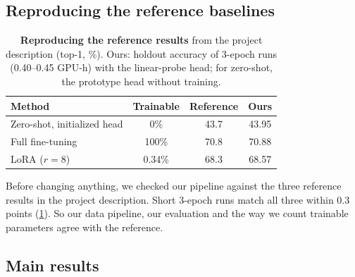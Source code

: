 \subsection{Reproducing the reference baselines}

\begin{table}[t]
  \centering
  \footnotesize
  \setlength{\tabcolsep}{4pt}
  \begin{tabular}{@{}lccc@{}}
    \toprule
    Method & Trainable & Reference & Ours \\
    \midrule
    Zero-shot, initialized head & 0\% & 43.7 & 43.95 \\
    Full fine-tuning & 100\% & 70.8 & 70.88 \\
    LoRA ($r=8$) & 0.34\% & 68.3 & 68.57 \\
    \bottomrule
  \end{tabular}
  \caption{\textbf{Reproducing the reference results} from the project description (top-1, \%).
  Ours: holdout accuracy of 3-epoch runs (0.40--0.45 GPU-h) with the linear-probe head; for zero-shot, the prototype head without training.}
  \label{tab:baselines}
\end{table}

Before changing anything, we checked our pipeline against the three reference results in the project description.
Short 3-epoch runs match all three within 0.3 points (\cref{tab:baselines}).
So our data pipeline, our evaluation and the way we count trainable parameters agree with the reference.

\subsection{Main results}
\label{sec:main}

